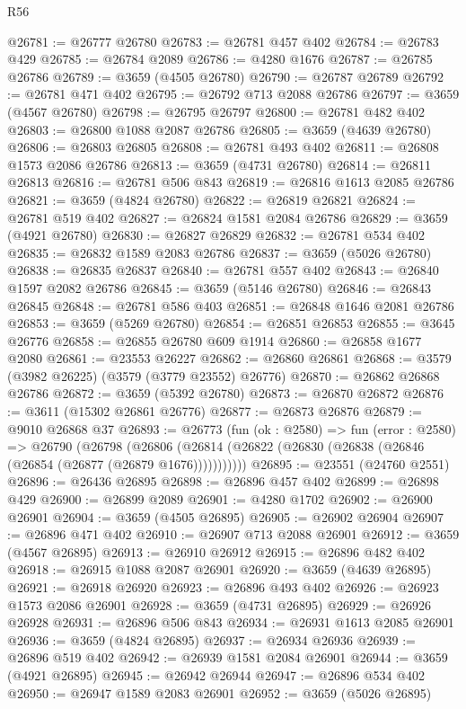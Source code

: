 \begin{lexlean}{R56}
\begin{coremodule}
@26781 := @26777 @26780
@26783 := @26781 @457 @402
@26784 := @26783 @429
@26785 := @26784 @2089
@26786 := @4280 @1676
@26787 := @26785 @26786
@26789 := @3659 (@4505 @26780)
@26790 := @26787 @26789
@26792 := @26781 @471 @402
@26795 := @26792 @713 @2088 @26786
@26797 := @3659 (@4567 @26780)
@26798 := @26795 @26797
@26800 := @26781 @482 @402
@26803 := @26800 @1088 @2087 @26786
@26805 := @3659 (@4639 @26780)
@26806 := @26803 @26805
@26808 := @26781 @493 @402
@26811 := @26808 @1573 @2086 @26786
@26813 := @3659 (@4731 @26780)
@26814 := @26811 @26813
@26816 := @26781 @506 @843
@26819 := @26816 @1613 @2085 @26786
@26821 := @3659 (@4824 @26780)
@26822 := @26819 @26821
@26824 := @26781 @519 @402
@26827 := @26824 @1581 @2084 @26786
@26829 := @3659 (@4921 @26780)
@26830 := @26827 @26829
@26832 := @26781 @534 @402
@26835 := @26832 @1589 @2083 @26786
@26837 := @3659 (@5026 @26780)
@26838 := @26835 @26837
@26840 := @26781 @557 @402
@26843 := @26840 @1597 @2082 @26786
@26845 := @3659 (@5146 @26780)
@26846 := @26843 @26845
@26848 := @26781 @586 @403
@26851 := @26848 @1646 @2081 @26786
@26853 := @3659 (@5269 @26780)
@26854 := @26851 @26853
@26855 := @3645 @26776
@26858 := @26855 @26780 @609 @1914
@26860 := @26858 @1677 @2080
@26861 := @23553 @26227
@26862 := @26860 @26861
@26868 := @3579 (@3982 @26225) (@3579 (@3779 @23552) @26776)
@26870 := @26862 @26868 @26786
@26872 := @3659 (@5392 @26780)
@26873 := @26870 @26872
@26876 := @3611 (@15302 @26861 @26776)
@26877 := @26873 @26876
@26879 := @9010 @26868 @37
@26893 := @26773
    (fun (ok : @2580) =>
    fun (error : @2580) =>
    @26790
      (@26798
        (@26806 (@26814 (@26822 (@26830 (@26838 (@26846 (@26854 (@26877 (@26879 @1676)))))))))))
@26895 := @23551 (@24760 @2551)
@26896 := @26436 @26895
@26898 := @26896 @457 @402
@26899 := @26898 @429
@26900 := @26899 @2089
@26901 := @4280 @1702
@26902 := @26900 @26901
@26904 := @3659 (@4505 @26895)
@26905 := @26902 @26904
@26907 := @26896 @471 @402
@26910 := @26907 @713 @2088 @26901
@26912 := @3659 (@4567 @26895)
@26913 := @26910 @26912
@26915 := @26896 @482 @402
@26918 := @26915 @1088 @2087 @26901
@26920 := @3659 (@4639 @26895)
@26921 := @26918 @26920
@26923 := @26896 @493 @402
@26926 := @26923 @1573 @2086 @26901
@26928 := @3659 (@4731 @26895)
@26929 := @26926 @26928
@26931 := @26896 @506 @843
@26934 := @26931 @1613 @2085 @26901
@26936 := @3659 (@4824 @26895)
@26937 := @26934 @26936
@26939 := @26896 @519 @402
@26942 := @26939 @1581 @2084 @26901
@26944 := @3659 (@4921 @26895)
@26945 := @26942 @26944
@26947 := @26896 @534 @402
@26950 := @26947 @1589 @2083 @26901
@26952 := @3659 (@5026 @26895)

\end{coremodule}
\end{lexlean}
